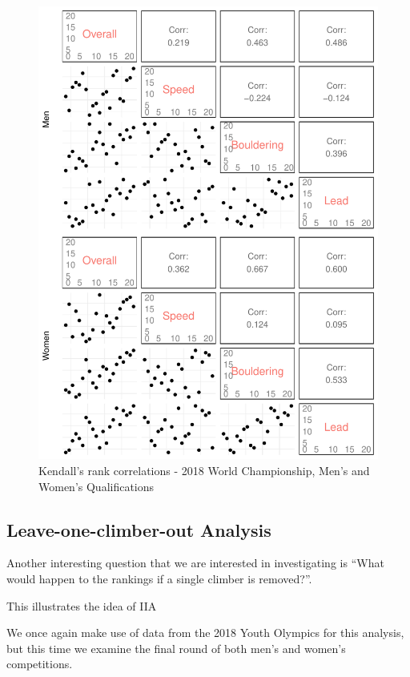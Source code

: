 \documentclass[12pt]{article}
\begin{document}
\begin{figure}
\centering
\includegraphics{draft_files/figure-latex/unnamed-chunk-9-1.pdf}
\caption{Kendall's rank correlations - 2018 World Championship, Men's
and Women's Qualifications}
\end{figure}

\hypertarget{leave-one-climber-out-analysis}{%
\subsection{Leave-one-climber-out
Analysis}\label{leave-one-climber-out-analysis}}

Another interesting question that we are interested in investigating is
``What would happen to the rankings if a single climber is removed?''.

This illustrates the idea of IIA

We once again make use of data from the 2018 Youth Olympics for this
analysis, but this time we examine the final round of both men's and
women's competitions.
\end{document}

